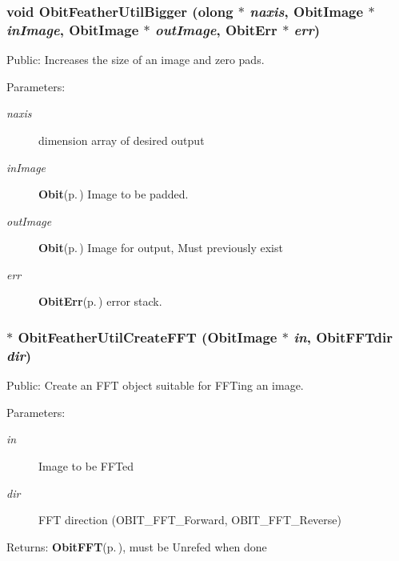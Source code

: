 \subsubsection{\setlength{\rightskip}{0pt plus 5cm}void Obit\-Feather\-Util\-Bigger ({\bf olong} $\ast$ {\em naxis}, {\bf Obit\-Image} $\ast$ {\em in\-Image}, {\bf Obit\-Image} $\ast$ {\em out\-Image}, {\bf Obit\-Err} $\ast$ {\em err})}\label{ObitFeatherUtil_8c_a4}


Public: Increases the size of an image and zero pads. 

\begin{Desc}
\item[Parameters:]
\begin{description}
\item[{\em naxis}]dimension array of desired output \item[{\em in\-Image}]{\bf Obit}{\rm (p.\,\pageref{structObit})} Image to be padded. \item[{\em out\-Image}]{\bf Obit}{\rm (p.\,\pageref{structObit})} Image for output, Must previously exist \item[{\em err}]{\bf Obit\-Err}{\rm (p.\,\pageref{structObitErr})} error stack. \end{description}
\end{Desc}
\subsubsection{$\ast$ Obit\-Feather\-Util\-Create\-FFT ({\bf Obit\-Image} $\ast$ {\em in}, Obit\-FFTdir {\em dir})}\label{ObitFeatherUtil_8c_a0}


Public: Create an FFT object suitable for FFTing an image. 

\begin{Desc}
\item[Parameters:]
\begin{description}
\item[{\em in}]Image to be FFTed \item[{\em dir}]FFT direction (OBIT\_\-FFT\_\-Forward, OBIT\_\-FFT\_\-Reverse) \end{description}
\end{Desc}
\begin{Desc}
\item[Returns:]{\bf Obit\-FFT}{\rm (p.\,\pageref{structObitFFT})}, must be Unrefed when done \end{Desc}
